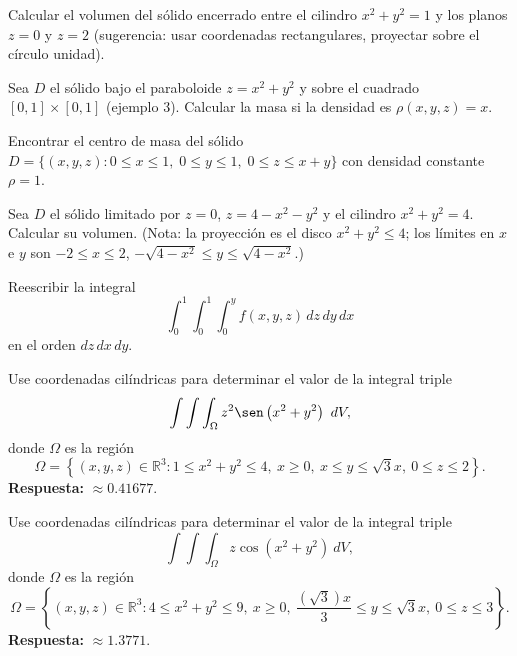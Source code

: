 \begin{prob}
Calcular el volumen del sólido encerrado entre el cilindro \(x^2+y^2=1\) y los planos \(z=0\) y \(z=2\) (sugerencia: usar coordenadas rectangulares, proyectar sobre el círculo unidad).
\end{prob}

\begin{prob}
Sea \(D\) el sólido bajo el paraboloide \(z=x^2+y^2\) y sobre el cuadrado \([0,1]\times[0,1]\) (ejemplo 3). Calcular la masa si la densidad es \(\rho(x,y,z) = x\).
\end{prob}


\begin{prob}
Encontrar el centro de masa del sólido \(D = \{ (x,y,z): 0\le x\le1,\;0\le y\le1,\;0\le z\le x+y \}\) con densidad constante \(\rho=1\).
\end{prob}

\begin{prob}
Sea \(D\) el sólido limitado por \(z=0\), \(z=4-x^2-y^2\) y el cilindro \(x^2+y^2=4\). Calcular su volumen. (Nota: la proyección es el disco \(x^2+y^2\le4\); los límites en \(x\) e \(y\) son \(-2\le x\le2\), \(-\sqrt{4-x^2}\le y\le\sqrt{4-x^2}\).)
\end{prob}

\begin{prob}
Reescribir la integral
\[
\int_{0}^{1}\int_{0}^{1}\int_{0}^{y} f(x,y,z)\,dz\,dy\,dx
\]
en el orden \(dz\,dx\,dy\).
\end{prob}

\begin{prob}
Use coordenadas cilíndricas para determinar el valor de la integral triple $$\displaystyle\int\int\int_{\Omega}z^2\sen\left( x^2+y^2 \right)\  dV,$$ donde $\Omega$ es la región $$\Omega=\left\lbrace (x,y,z)\in \mathbb{R}^3 : 1\leq x^2+y^2 \leq 4,\ x\geq 0,\ x\leq y \leq \sqrt{3}x,\ 0\leq z\leq 2 \right\rbrace.$$ \textbf{Respuesta:} $\approx 0.41677$.
\end{prob}


\begin{prob}
Use coordenadas cilíndricas para determinar el valor de la integral triple $$\displaystyle\int\int\int_{\Omega}z\cos\left( x^2+y^2 \right)\ dV,$$ donde $\Omega$ es la región $$\Omega=\left\lbrace (x,y,z)\in \mathbb{R}^3 : 4\leq x^2+y^2 \leq 9,\  x\geq 0,\ \dfrac{(\sqrt{3})x}{3} \leq y \leq \sqrt{3}x,\ 0\leq z\leq 3 \right\rbrace.$$ \textbf{Respuesta:} $\approx 1.3771$.
\end{prob}


